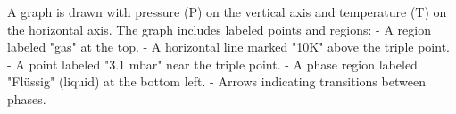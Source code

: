 A graph is drawn with pressure (P) on the vertical axis and temperature (T) on the horizontal axis. The graph includes labeled points and regions:  
- A region labeled "gas" at the top.  
- A horizontal line marked "10K" above the triple point.  
- A point labeled "3.1 mbar" near the triple point.  
- A phase region labeled "Flüssig" (liquid) at the bottom left.  
- Arrows indicating transitions between phases.